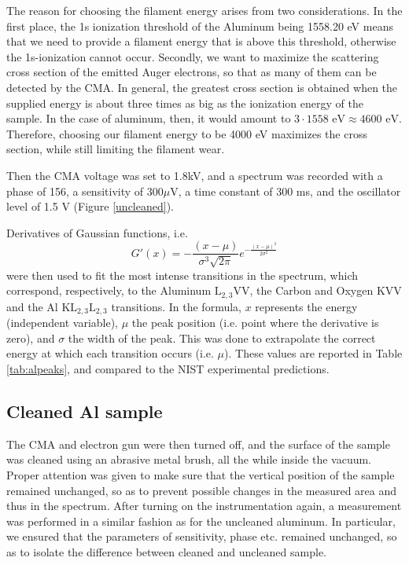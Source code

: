 \documentclass[12pt]{article}
\begin{document}
The reason for choosing the filament energy arises from two considerations. In the first place, the 1s ionization threshold of the Aluminum being 1558.20 eV \cite{palmberg1991handbook} means that we need to provide a filament energy that is above this threshold, otherwise the 1s-ionization cannot occur. Secondly, we want to maximize the scattering cross section of the emitted Auger electrons, so that as many of them can be detected by the CMA. In general, the greatest cross section is obtained when the supplied energy is about three times as big as the ionization energy of the sample. In the case of aluminum, then, it would amount to $3 \cdot 1558 \text{ eV}\approx 4600 \text{ eV}$. Therefore, choosing our filament energy to be 4000 eV maximizes the cross section, while still limiting the filament wear.

Then the CMA voltage was set to 1.8kV, and a spectrum was recorded with a phase of 156\degree, a sensitivity of $300 \mu $V, a time constant of 300 ms, and the oscillator level of 1.5 V (Figure \ref{uncleaned}).


Derivatives of Gaussian functions, i.e. \[
G'(x) = -\frac{(x - \mu)}{\sigma^3 \sqrt{2 \pi}} e^{-\frac{(x - \mu)^2}{2 \sigma^2}}
\]  were then used to fit the most intense transitions in the spectrum, which correspond, respectively, to the Aluminum $\text{L}_{2,3}\text{VV}$, the Carbon and Oxygen KVV and the Al $\text{KL}_{2,3}\text{L}_{2,3}$ transitions. In the formula, $x$ represents the energy (independent variable), $\mu$ the peak position (i.e. point where the derivative is zero), and $\sigma$ the width of the peak.
This was done to extrapolate the correct energy at which each transition occurs (i.e. $\mu$). These values are reported in Table \ref{tab:alpeaks}, and compared to the NIST experimental predictions.


\subsection{Cleaned Al sample}
The CMA and electron gun were then turned off, and the surface of the sample was cleaned using an abrasive metal brush, all the while inside the vacuum. Proper attention was given to make sure that the vertical position of the sample remained unchanged, so as to prevent possible changes in the measured area and thus in the spectrum.
After turning on the instrumentation again, a measurement was performed in a similar fashion as for the uncleaned aluminum. In particular, we ensured that the parameters of sensitivity, phase etc. remained unchanged, so as to isolate the difference between cleaned and uncleaned sample.
\end{document}
